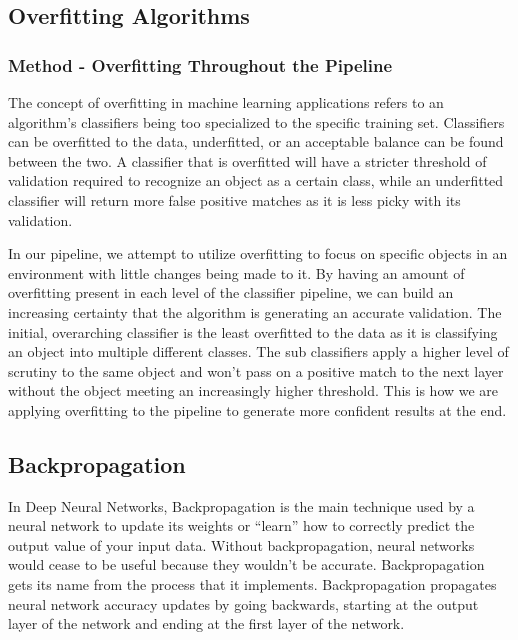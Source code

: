 \documentclass[draftclsnofoot, onecolumn, 10pt, compsoc]{IEEEtran}
\begin{document}
\subsection{Overfitting Algorithms}

\subsubsection{Method - Overfitting Throughout the Pipeline}
The concept of overfitting in machine learning applications refers to an algorithm’s classifiers being too specialized to the specific training set. Classifiers can be overfitted to the data, underfitted, or an acceptable balance can be found between the two. A classifier that is overfitted will have a stricter threshold of validation required to recognize an object as a certain class, while an underfitted classifier will return more false positive matches as it is less picky with its validation. 

In our pipeline, we attempt to utilize overfitting to focus on specific objects in an environment with little changes being made to it. By having an amount of overfitting present in each level of the classifier pipeline, we can build an increasing certainty that the algorithm is generating an accurate validation. The initial, overarching classifier is the least overfitted to the data as it is classifying an object into multiple different classes. The sub classifiers apply a higher level of scrutiny to the same object and won’t pass on a positive match to the next layer without the object meeting an increasingly higher threshold. This is how we are applying overfitting to the pipeline to generate more confident results at the end. 


\subsection{Backpropagation}
	In Deep Neural Networks, Backpropagation is the main technique used by a neural network to update its weights or “learn” how to correctly predict the output value of your input data. Without backpropagation, neural networks would cease to be useful because they wouldn’t be accurate. Backpropagation gets its name from the process that it implements. Backpropagation propagates neural network accuracy updates by going backwards, starting at the output layer of the network and ending at the first layer of the network. 
    
\end{document}
